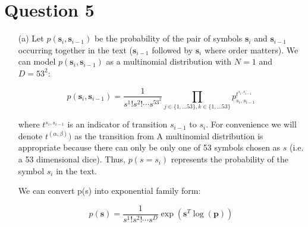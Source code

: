 \documentclass[12pt]{article}
\begin{document}
\newpage
\section*{Question 5}

\begin{enumerate}

%
%
%
%


\item[(a)] Let $p(\textbf{s}_i,\textbf{s}_{i-1})$ be the probability of the pair of symbols $\textbf{s}_i$ and $\textbf{s}_{i-1}$ occurring together in the text ($\textbf{s}_{i-1}$ followed by $\textbf{s}_i$ where order matters).
We can model $p(\textbf{s}_i,\textbf{s}_{i-1})$ as a multinomial distribution with $N=1$ and $D=53^2$:

$$p(\textbf{s}_i,\textbf{s}_{i-1}) = \frac{1}{s^1! s^2! \cdots s^{53^2}} \prod_{j \in \{1,...53\}, k \in \{1,...53\}} p_{s_i, s_{i-1}}^{t^{s_i, s_{i-1}}}$$

where $t^{s_i, s_{i-1}}$ is an indicator of transition $s_{i-1}$ to $s_i$.
For convenience we will denote $t^{(\alpha, \beta)})$ as the transition from
A multinomial distribution is appropriate because there can only be only one of 53 symbols chosen as $s$ (i.e. a 53 dimensional dice).
Thus, $p(s=s_i)$ represents the probability of the symbol $s_i$ in the text.

We can convert p(s) into exponential family form:

$$p(\textbf{s}) = \frac{1}{s^1! s^2! \cdots s^D} \exp{(\textbf{s}^T \log(\textbf{p}))}$$


\end{enumerate}
\end{document}
